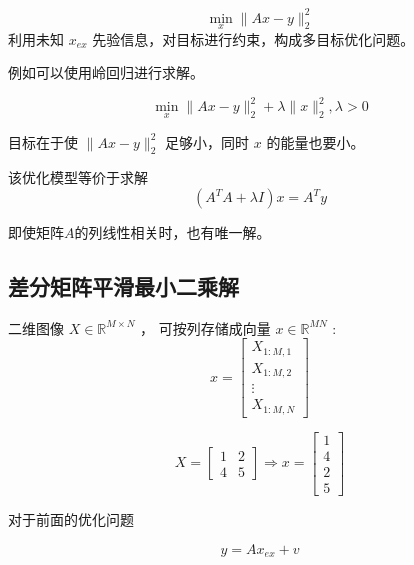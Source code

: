 \begin{problem}[最小二乘法进行估计]
    $$
\min _{x}\|A x-y\|_{2}^{2}
$$
利用未知 $ x_{e x} $ 先验信息，对目标进行约束，构成多目标优化问题。 
\end{problem}


例如可以使用岭回归进行求解。


\begin{definition}
    $$
\min _{x}\|A x-y\|_{2}^{2}+\lambda\|x\|_{2}^{2}, \lambda>0
$$
\end{definition}

目标在于使 $ \|A x-y\|_{2}^{2} $ 足够小，同时 $ x $ 的能量也要小。

\begin{theorem}[岭回归问题的标准方程]
    该优化模型等价于求解
$$
\left(A^{T} A+\lambda I\right) x=A^{T} y
$$
\end{theorem}

即使矩阵$A$的列线性相关时，也有唯一解。

\subsection{差分矩阵平滑最小二乘解}

\begin{definition}[图像转换为列向量存储]
    二维图像 $ X \in \mathbb{R}^{M \times N} $ ， 可按列存储成向量 $ x \in \mathbb{R}^{M N} $ :
    $$
    x=\left[\begin{array}{c}
    X_{1: M, 1} \\
    X_{1: M, 2} \\
    \vdots \\
    X_{1: M, N}
    \end{array}\right] $$ 
\end{definition}


\begin{example}
    $$ 
X=\left[\begin{array}{ll}
1 & 2 \\
4 & 5
\end{array}\right] \Rightarrow x=\left[\begin{array}{l}
1 \\
4 \\
2 \\
5
\end{array}\right]
$$
\end{example}

对于前面的优化问题

$$
y=A x_{e x}+v
$$

